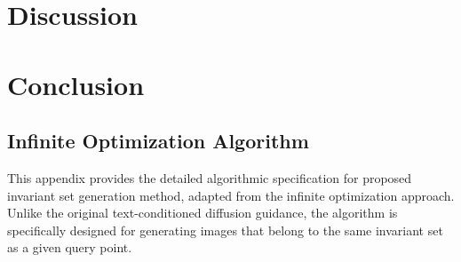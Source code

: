 \documentclass[licencjacka,en]{pracamgr}
\begin{document}
\chapter{Discussion}\label{r:discussion}

\chapter{Conclusion}\label{r:conclusion}
\appendix

\section{Infinite Optimization Algorithm}\label{appendix:infinite_optimization}
This appendix provides the detailed algorithmic specification for proposed invariant set generation method, adapted from the infinite optimization approach. Unlike the original text-conditioned diffusion guidance, the algorithm is specifically designed for generating images that belong to the same invariant set as a given query point.
\end{document}
